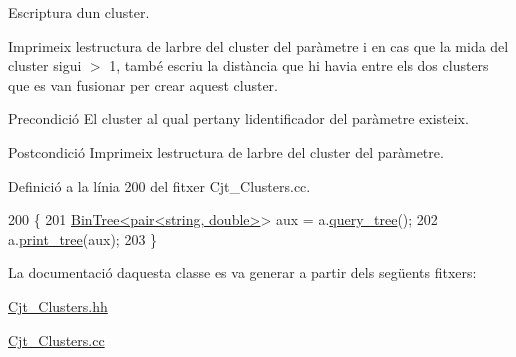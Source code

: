 Escriptura d\textquotesingle{}un cluster. 

Imprimeix l\textquotesingle{}estructura de l\textquotesingle{}arbre del cluster del paràmetre i en cas que la mida del cluster sigui $>$ 1, també escriu la distància que hi havia entre els dos clusters que es van fusionar per crear aquest cluster.

\begin{DoxyPrecond}{Precondició}
El cluster al qual pertany l\textquotesingle{}identificador del paràmetre existeix. 
\end{DoxyPrecond}
\begin{DoxyPostcond}{Postcondició}
Imprimeix l\textquotesingle{}estructura de l\textquotesingle{}arbre del cluster del paràmetre. 
\end{DoxyPostcond}


Definició a la línia 200 del fitxer Cjt\+\_\+\+Clusters.\+cc.


\begin{DoxyCode}
200                                          \{
201     \hyperlink{class_bin_tree}{BinTree<pair<string, double>}> aux = a.\hyperlink{class_cluster_ac29060dfec64d073f740f7408ecabbbe}{query\_tree}();
202     a.\hyperlink{class_cluster_adc8ff607dd745107b5b6a454ac196e55}{print\_tree}(aux);
203 \}
\end{DoxyCode}


La documentació d\textquotesingle{}aquesta classe es va generar a partir dels següents fitxers\+:\begin{DoxyCompactItemize}
\item 
\hyperlink{_cjt___clusters_8hh}{Cjt\+\_\+\+Clusters.\+hh}\item 
\hyperlink{_cjt___clusters_8cc}{Cjt\+\_\+\+Clusters.\+cc}\end{DoxyCompactItemize}
